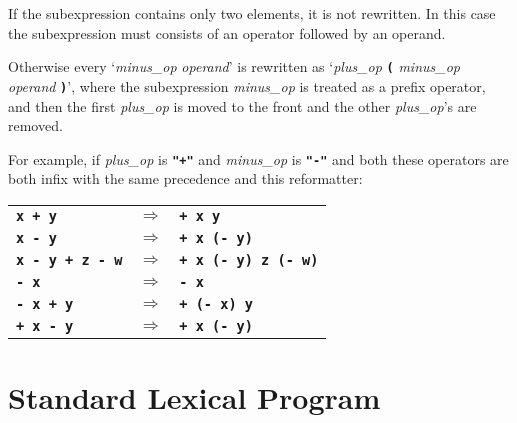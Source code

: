 \documentclass[12pt]{article}
\newcommand{\TT}[1]{{\tt \bfseries #1}}
\newenvironment{indpar}[1][0.3in]%
	{\begin{list}{}%
		     {\setlength{\itemsep}{0in}%
		      \setlength{\topsep}{0in}%
		      \setlength{\parsep}{1ex}%
		      \setlength{\labelwidth}{#1}%
		      \setlength{\leftmargin}{#1}%
		      \addtolength{\leftmargin}{\labelsep}}%
	 \item}%
	{\end{list}}
\begin{document}
\begin{indpar}[1em]
\begin{indpar}[0.5em]
If the subexpression contains only two elements, it is not rewritten.
In this case the subexpression must consists of an operator followed
by an operand.

Otherwise every `{\em minus\_op} {\em operand}' is rewritten as
`{\em plus\_op} \TT{(} {\em minus\_op} {\em operand} \TT{)}', where
the subexpression {\em minus\_op} is treated as a prefix operator, and
then the first {\em plus\_op} is moved to the front and the other
{\em plus\_op}'s are removed.

For example, if {\em plus\_op} is \TT{"+"} and {\em minus\_op} is
\TT{"-"} and both these operators are both infix with
the same precedence and this reformatter:

\hspace*{2em}\begin{tabular}{lcl}
\TT{x + y} & $\Longrightarrow$ & \TT{+ x y} \\
\TT{x - y} & $\Longrightarrow$ & \TT{+ x (- y)} \\
\TT{x - y + z - w} & $\Longrightarrow$ & \TT{+ x (- y) z (- w)} \\
\TT{- x} & $\Longrightarrow$ & \TT{- x} \\
\TT{- x + y} & $\Longrightarrow$ & \TT{+ (- x) y} \\
\TT{+ x - y} & $\Longrightarrow$ & \TT{+ x (- y)} \\
\end{tabular}

\end{indpar}

\bigskip

\end{indpar}



\clearpage

\appendix

\section{Standard Lexical Program}
\label{STANDARD-LEXICAL-PROGRAM}
\end{document}
